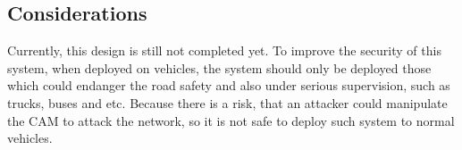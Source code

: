 \subsection{Considerations}

Currently, this design is still not completed yet.
To improve the security of this system,
when deployed on vehicles,
the system should only be deployed those which could endanger the road safety and also under serious supervision,
such as trucks, buses and etc.
Because there is a risk, that an attacker could manipulate the CAM to attack the network,
so it is not safe to deploy such system to normal vehicles.